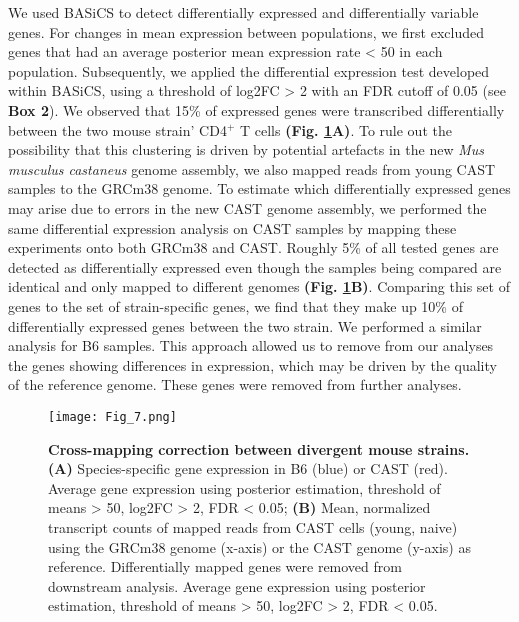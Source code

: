 We used BASiCS to detect differentially expressed and differentially variable genes. For changes in mean expression between populations, we first excluded genes that had an average posterior mean expression rate < 50 in each population. Subsequently, we applied the differential expression test developed within BASiCS, using a threshold of log2FC > 2 with an FDR cutoff of 0.05 (see \textbf{Box 2}). We observed that 15\% of expressed genes were transcribed differentially between the two mouse strain’ CD4$^+$ T cells \textbf{(Fig. \ref{fig1:spec_spec_mapping}A)}. To rule out the possibility that this clustering is driven by potential artefacts in the new \textit{Mus musculus castaneus} genome assembly, we also mapped reads from young CAST samples to the GRCm38 genome. To estimate which differentially expressed genes may arise due to errors in the new CAST genome assembly, we performed the same differential expression analysis on CAST samples by mapping these experiments onto both GRCm38 and CAST. Roughly 5\% of all tested genes are detected as differentially expressed even though the samples being compared are identical and only mapped to different genomes \textbf{(Fig. \ref{fig1:spec_spec_mapping}B)}. Comparing this set of genes to the set of strain-specific genes, we find that they make up 10\% of differentially expressed genes between the two strain. We performed a similar analysis for B6 samples. This approach allowed us to remove from our analyses the genes showing differences in expression, which may be driven by the quality of the reference genome. These genes were removed from further analyses.

\begin{figure}[!hb]
\centering
\texttt{[image: Fig\_7.png]}
\caption[Cross-mapping correction between divergent mouse strains]{\textbf{Cross-mapping correction between divergent mouse strains.}\\
\textbf{(A)} Species-specific gene expression in B6 (blue) or CAST (red). Average gene expression using posterior estimation, threshold of means > 50, log2FC > 2, FDR < 0.05; \textbf{(B)} Mean, normalized transcript counts of mapped reads from CAST cells (young, naive) using the GRCm38 genome (x-axis) or the CAST genome (y-axis) as reference. Differentially mapped genes were removed from downstream analysis. Average gene expression using posterior estimation, threshold of means > 50, log2FC > 2, FDR < 0.05.
}
\label{fig1:spec_spec_mapping}
\end{figure}


